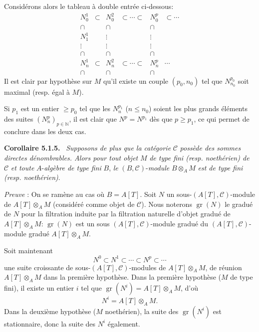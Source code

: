 \documentclass[11pt]{article}
\newenvironment{statement}[1]{\par\medskip\noindent\textbf{#1.}\ }{\par\medskip}
\providecommand{\gr}{\operatorname{gr}}
\providecommand{\gr}{\operatorname{gr}}
\providecommand{\gr}{\operatorname{gr}}
\begin{document}
Considérons alors le tableau à double entrée ci-dessous:
\[
\begin{array}{cccccc}
N_0^1&\subset&N_0^2&\subset\cdots\subset&N_0^p&\subset\cdots\\
\cap&&\cap&&\cap\\
N_1^1&&\vdots&&\vdots\\
\vdots&&\vdots&&\vdots\\
\cap&&\cap&&\cap\\
N_n^1&\subset&N_n^2&\subset\cdots\subset&N_n^p&\cdots\\
\cap&&\cap&&\cap
\end{array}
\]
Il est clair par hypothèse sur \(M\) qu'il existe un couple \((p_0,n_0)\) tel que \(N^{p_0}_{n_0}\) soit maximal (resp. égal à \(M\)).

Si \(p_1\) est un entier \(\ge p_0\) tel que les \(N_n^{p_1}\) (\(n\le n_0\)) soient les plus grands éléments des suites \((N_n^p)_{p\in\mathbb N}\), il est clair que \(N^p=N^{p_1}\) dès que \(p\ge p_1\), ce qui permet de conclure dans les deux cas.

\begin{statement}{Corollaire 5.1.5}
\emph{Supposons de plus que la catégorie} \(\mathcal C\) \emph{possède des sommes directes dénombrables. Alors pour tout objet} \(M\) \emph{de type fini (resp. noethérien) de} \(\mathcal C\) \emph{et toute} \(A\)-\emph{algèbre de type fini} \(B\), \emph{le} \((B,\mathcal C)\)-\emph{module} \(B\otimes_A M\) \emph{est de type fini (resp. noethérien)}.
\end{statement}

\emph{Preuve} : On se ramène au cas où \(B=A[T]\). Soit \(N\) un sous-\((A[T],\mathcal C)\)-module de \(A[T]\otimes_A M\) (considéré comme objet de \(\mathcal C\)). Nous noterons \(\gr(N)\) le gradué de \(N\) pour la filtration induite par la filtration naturelle d'objet gradué de \(A[T]\otimes_A M\): \(\gr(N)\) est un sous \((A[T],\mathcal C)\)-module gradué du \((A[T],\mathcal C)\)-module gradué \(A[T]\otimes_A M\).

Soit
maintenant
\[
N^0\subset N^1\subset\cdots\subset N^p\subset\cdots
\]
une suite croissante de sous-\((A[T],\mathcal C)\)-modules de \(A[T]\otimes_A M\), de réunion \(A[T]\otimes_A M\) dans la première hypothèse. Dans la première hypothèse (\(M\) de type fini), il existe un entier \(i\) tel que \(\gr(N^i)=A[T]\otimes_A M\), d'où
\[
N^i=A[T]\otimes_A M.
\]
Dans la deuxième hypothèse (\(M\) noethérien), la suite des \(\gr(N^i)\) est stationnaire, donc la suite des \(N^i\) également.
\end{document}
